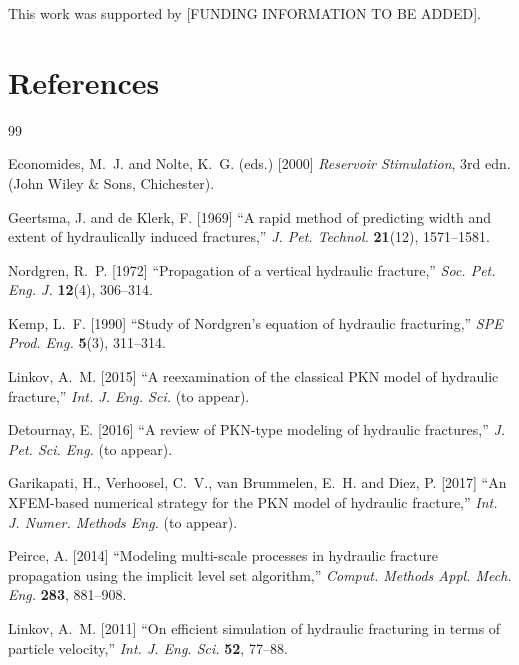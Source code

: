 \documentclass{ws-ijcm}
\begin{document}
This work was supported by [FUNDING INFORMATION TO BE ADDED].

\section*{References}

\begin{thebibliography}{99}

Economides, M.~J. and Nolte, K.~G. (eds.) [2000] \emph{Reservoir Stimulation},
  3rd edn. (John Wiley \& Sons, Chichester).

Geertsma, J. and de Klerk, F. [1969] ``A rapid method of predicting width and
  extent of hydraulically induced fractures,''
  \emph{J. Pet. Technol.} \textbf{21}(12), 1571--1581.

Nordgren, R.~P. [1972] ``Propagation of a vertical hydraulic fracture,''
  \emph{Soc. Pet. Eng. J.} \textbf{12}(4), 306--314.

Kemp, L.~F. [1990] ``Study of Nordgren's equation of hydraulic fracturing,''
  \emph{SPE Prod. Eng.} \textbf{5}(3), 311--314.

Linkov, A.~M. [2015] ``A reexamination of the classical PKN model of hydraulic
  fracture,''
  \emph{Int. J. Eng. Sci.} (to appear).

Detournay, E. [2016] ``A review of PKN-type modeling of hydraulic fractures,''
  \emph{J. Pet. Sci. Eng.} (to appear).

Garikapati, H., Verhoosel, C.~V., van Brummelen, E.~H. and Diez, P. [2017]
  ``An XFEM-based numerical strategy for the PKN model of hydraulic fracture,''
  \emph{Int. J. Numer. Methods Eng.} (to appear).

Peirce, A. [2014] ``Modeling multi-scale processes in hydraulic fracture
  propagation using the implicit level set algorithm,''
  \emph{Comput. Methods Appl. Mech. Eng.} \textbf{283}, 881--908.

Linkov, A.~M. [2011] ``On efficient simulation of hydraulic fracturing in terms
  of particle velocity,''
  \emph{Int. J. Eng. Sci.} \textbf{52}, 77--88.


\end{thebibliography}
\end{document}

